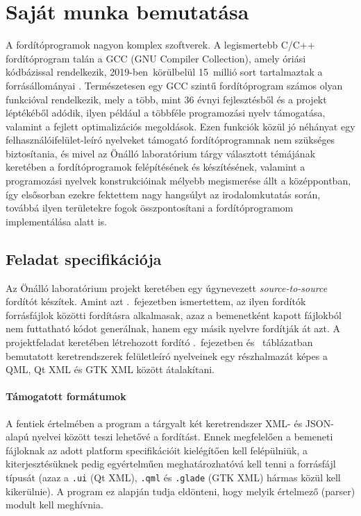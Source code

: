 
\chapter{Saját munka bemutatása}

A fordítóprogramok nagyon komplex szoftverek. A legismertebb C/C++ fordítóprogram talán a GCC (GNU Compiler Collection), amely óriási kódbázissal rendelkezik, 2019-ben~körülbelül 15~millió sort tartalmaztak a forrásállományai \cite{GccWiki}. Természetesen egy GCC szintű fordítóprogram számos olyan funkcióval rendelkezik, mely a több, mint 36 évnyi fejlesztésből és a projekt léptékéből adódik, ilyen például a többféle programozási nyelv támogatása, valamint a fejlett optimalizációs megoldások. Ezen funkciók közül jó néhányat egy felhasználóifelület-leíró nyelveket támogató fordítóprogramnak nem szükséges biztosítania, és mivel az Önálló laboratórium tárgy választott témájának keretében a fordítóprogramok felépítésének és készítésének, valamint a programozási nyelvek konstrukcióinak mélyebb megismerése állt a középpontban, így elsősorban ezekre fektettem nagy hangsúlyt az irodalomkutatás során, továbbá ilyen területekre fogok összpontosítani a fordítóprogramom implementálása alatt is.



\section{Feladat specifikációja}
Az Önálló laboratórium projekt keretében egy úgynevezett \textit{source-to-source} fordítót készítek. Amint azt .~fejezetben ismertettem, az ilyen fordítók forrásfájlok közötti fordításra alkalmasak, azaz a bemenetként kapott fájlokból nem futtatható kódot generálnak, hanem egy másik nyelvre fordítják át azt. A projektfeladat keretében létrehozott fordító .~fejezetben és ~táblázatban bemutatott keretrendszerek felületleíró nyelveinek egy részhalmazát képes a QML, Qt XML és GTK XML között átalakítani.

\subsubsection{Támogatott formátumok}
A fentiek értelmében a program a tárgyalt két keretrendszer XML- és JSON-alapú nyelvei között teszi lehetővé a fordítást. Ennek megfelelően a bemeneti fájloknak az adott platform specifikációit kielégítően kell felépülniük, a kiterjesztésüknek pedig egyértelműen meghatározhatóvá kell tenni a forrásfájl típusát (azaz a \texttt{.ui} (Qt XML), \texttt{.qml} és \texttt{.glade} (GTK XML) hármas közül kell kikerülnie). A program ez alapján tudja eldönteni, hogy melyik értelmező (parser) modult kell meghívnia.

